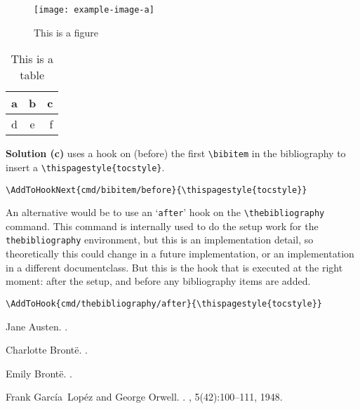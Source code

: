 \documentclass[a4paper,12pt,twoside]{report}
\begin{document}
\clearpage 
{}
\pagestyle{fancy}

\blinddocument
\begin{figure}
  \centering
  \texttt{[image: example-image-a]}
  \caption{This is a figure}
\end{figure}
\blinddocument
\blinddocument
\begin{table}
  \centering
  \begin{tabular}{|l|c|r|}
    \hline
    a & b & c \\
    \hline
    d & e & f \\
    \hline
  \end{tabular}
  \caption{This is a table}
\end{table}
\blinddocument
\blinddocument

\clearpage

\begin{boxedminipage}{\textwidth}
\textbf{Solution (c)} uses a hook on (before) the first \verb|\bibitem| in the bibliography to insert a \verb|\thispagestyle{tocstyle}|.

\begin{verbatim}
\AddToHookNext{cmd/bibitem/before}{\thispagestyle{tocstyle}}
\end{verbatim}

An alternative would be to use an `\texttt{after}' hook on the \verb|\thebibliography| command. This command is internally used to do the setup work for the \texttt{thebibliography} environment, but this is an implementation detail, so theoretically this could change in a future implementation, or an implementation in a different documentclass. But this is the hook that is executed at the right moment: after the setup, and before any bibliography items are added.

\begin{verbatim}
\AddToHook{cmd/thebibliography/after}{\thispagestyle{tocstyle}}
\end{verbatim}
\end{boxedminipage}

\clearpage
\pagestyle{tocstyle}

% 
% 

\begin{thebibliography}{1}

Jane Austen.
.

Charlotte Brontë.
.

Emily Brontë.
.

Frank García~Lopéz and George Orwell.
.
, 5(42):100--111, 1948.

\end{thebibliography}
\end{document}
